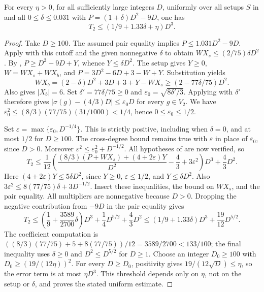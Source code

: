 \begin{lemma}
For every $\eta>0$, for all sufficiently large integers $D$, uniformly
over all setups $S$ in  and
all $0\le\delta\le0.031$ with $P=(1+\delta)D^2-9D$, one has
\[
T_2\le(1/9+1.33\delta+\eta)D^3.
\]
\end{lemma}
\begin{proof}
Take $D\ge100$. The assumed pair equality implies
$P\le1.031D^2-9D$. Apply 
with this cutoff and the given nonnegative $\delta$ to obtain
$WX_s\le(2/75)\delta D^2$.
By ,
$P\ge D^2-9D+Y$, whence $Y\le\delta D^2$.
The setup gives $Y\ge0$, $W=WX_s+WX_b$, and
$P=3D^2-6D+3-W+Y$. Substitution yields
\[
WX_b=(2-\delta)D^2+3D+3+Y-WX_s
 \ge (2-77\delta/75)D^2.
\]
Also  gives $|X_b|=6$.
Set $\delta'=77\delta/75\ge0$ and
$\varepsilon_0=\sqrt{8\delta'/3}$. Applying
 with $\delta'$
therefore gives $|\sigma(g)-(4/3)D|\le\varepsilon_0D$ for every $g\in V_2$.
We have $\varepsilon_0^2\le (8/3)(77/75)(31/1000)<1/4$, hence
$0\le\varepsilon_0\le1/2$.

Set $\varepsilon=\max\{\varepsilon_0,D^{-1/4}\}$. This is strictly
positive, including when $\delta=0$, and at most $1/2$ for $D\ge100$.
The cross-degree bound remains true with $\varepsilon$ in place of
$\varepsilon_0$, since $D>0$. Moreover
$\varepsilon^2\le\varepsilon_0^2+D^{-1/2}$.
All hypotheses of 
are now verified, so
\[
T_2\le\frac1{12}\left(
 \frac{(8/3)(P+WX_s)+(4+2\varepsilon)Y}{D^2}
 -\frac43+3\varepsilon^2\right)D^3+\frac43D^2.
\]
Here $(4+2\varepsilon)Y\le5\delta D^2$, since $Y\ge0$,
$\varepsilon\le1/2$, and $Y\le\delta D^2$.
Also $3\varepsilon^2\le8(77/75)\delta+3D^{-1/2}$.
Insert these inequalities, the bound on $WX_s$, and the pair equality.
All multipliers are nonnegative because $D>0$. Dropping the negative
contribution from $-9D$ in the pair equality gives
\[
T_2\le\left(\frac19+\frac{3589}{2700}\delta\right)D^3
 +\frac14D^{5/2}+\frac43D^2
 \le(1/9+1.33\delta)D^3+\frac{19}{12}D^{5/2}.
\]
The coefficient computation is
$((8/3)(77/75)+5+8(77/75))/12=3589/2700<133/100$;
the final inequality uses $\delta\ge0$ and $D^2\le D^{5/2}$ for $D\ge1$.
Choose an integer $D_0\ge100$ with
$D_0\ge(19/(12\eta))^2$. For every $D\ge D_0$, positivity gives
$19/(12\sqrt D)\le\eta$, so the error term is at most $\eta D^3$.
This threshold depends only on $\eta$, not on the setup or $\delta$,
and proves the stated uniform estimate.
\end{proof}

